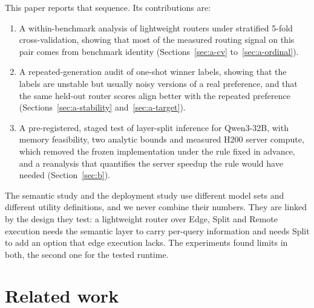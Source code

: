 \documentclass[lettersize,journal]{IEEEtran}
\begin{document}
This paper reports that sequence. Its contributions are:
\begin{enumerate}
\item A within-benchmark analysis of lightweight routers under stratified 5-fold cross-validation, showing that most of the measured routing signal on this pair comes from benchmark identity (Sections~\ref{sec:a-cv} to~\ref{sec:a-ordinal}).
\item A repeated-generation audit of one-shot winner labels, showing that the labels are unstable but usually noisy versions of a real preference, and that the same held-out router scores align better with the repeated preference (Sections~\ref{sec:a-stability} and~\ref{sec:a-target}).
\item A pre-registered, staged test of layer-split inference for Qwen3-32B, with memory feasibility, two analytic bounds and measured H200 server compute, which removed the frozen implementation under the rule fixed in advance, and a reanalysis that quantifies the server speedup the rule would have needed (Section~\ref{sec:b}).
\end{enumerate}
The semantic study and the deployment study use different model sets and different utility definitions, and we never combine their numbers. They are linked by the design they test: a lightweight router over Edge, Split and Remote execution needs the semantic layer to carry per-query information and needs Split to add an option that edge execution lacks. The experiments found limits in both, the second one for the tested runtime.

\section{Related work}
\label{sec:bg-related}
\end{document}
